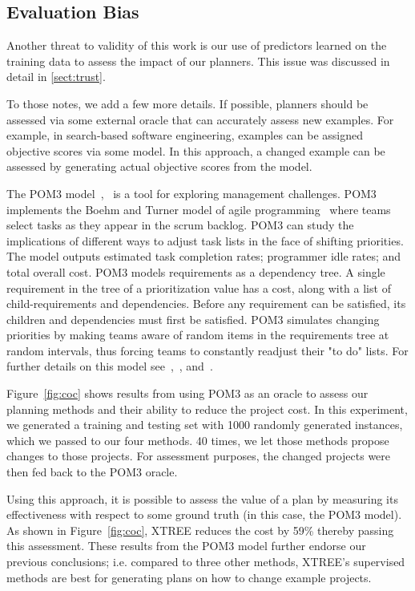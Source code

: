 \documentclass{sig-alternate}
\newcommand{\tion}[1]{\textsection\ref{sect:#1}}
\newcommand{\fig}[1]{Figure~\ref{fig:#1}}
\begin{document}
\subsection{  Evaluation Bias}\label{sect:coc}
Another threat to validity of this work is our use
of predictors learned on the training data to assess the impact of our planners.
This issue was discussed in detail in \tion{trust}. 

To those notes, we add a few more details. If possible, planners should be assessed via some external oracle that can accurately assess new examples. For example, in search-based software engineering,
examples can be assigned objective scores via  some model. In this approach, a changed example can be assessed by
generating actual objective scores from the model. 



The POM3 model~\cite{boehm2003using},~\cite{port2008} is a tool for exploring management challenges. POM3 implements the Boehm and Turner model of agile programming~\cite{boehm2003balancing} where teams select tasks as they appear in the scrum backlog.  POM3 can study the implications of different ways to adjust task lists in the face of shifting priorities. The model outputs estimated task completion rates; programmer idle rates; and total overall cost. POM3 models requirements as a dependency tree. A single requirement in the tree of a prioritization value has a cost, along with a list of child-requirements and dependencies. Before any requirement can be satisfied, its children and dependencies must first be satisfied. POM3 simulates changing priorities by making teams aware of random items in the requirements tree at random intervals, thus forcing teams to constantly readjust their "to do" lists. For further details on this model see~\cite{boehm2003using},~\cite{port2008}, and~\cite{boehm2003balancing}. 

\fig{coc} shows results from using POM3 as an oracle to assess our planning methods and their ability to reduce the project cost. In this experiment, we generated a training and testing set with 1000 randomly generated instances, which we passed to our four methods.
40 times, we let those methods propose changes to those projects. 
For assessment purposes, the changed projects were then fed back to the POM3
oracle. 

Using this approach, it is possible to assess the value of a plan by measuring its
effectiveness with respect to some ground truth (in this case, the POM3 model).
As shown in \fig{coc}, XTREE reduces the cost by 59\% thereby passing this assessment. These results from the POM3 model further endorse our previous conclusions; i.e. compared to three other methods,  XTREE's supervised methods are best for generating plans on how to change example projects.
 
\end{document}
